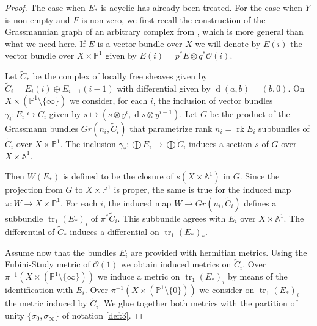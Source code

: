 \documentclass[10pt,twoside]{article}
\numberwithin{equation}{section}
\theoremstyle{plain}
\theoremstyle{definition}
\DeclareMathOperator{\tr}{tr}
\DeclareMathOperator{\dd}{d}
\DeclareMathOperator{\rk}{rk}
\begin{document}
\begin{proof}
  The case when $E_{\ast}$ is acyclic has already been treated. For
  the case when $Y$ is non-empty and $F$ is non zero, 
  we first recall the construction  of the
  Grassmannian graph of an arbitrary complex from
  \cite{GilletSoule:aRRt}, which 
  is more general than what we need here. If
  $E$ is a vector bundle over $X$ we will denote by $E(i)$ the vector
  bundle over $X\times \mathbb{P}^{1}$ given by $E(i)=p^{\ast}E\otimes
  q^{\ast} \mathcal{O}(i)$.

  Let
  $\widetilde C_{\ast}$ be the complex of locally free sheaves given
  by $\widetilde C_{i}=E_{i}(i)\oplus E_{i-1}(i-1)$ with differential
  given by $\dd(a,b)=(b,0)$. On $X\times (\mathbb{P}^{1}\setminus
  \{\infty\})$ we consider, for each $i$, the inclusion of vector
  bundles $\gamma _{i}\colon E_{i}\hookrightarrow \widetilde C_{i}$ given by
  $s\longmapsto (s\otimes y^{i},\dd s\otimes y^{i-1})$. Let $G$ be the
  product of the Grassmann bundles $Gr(n_{i},\widetilde C_{i})$
  that parametrize rank $n_{i}=\rk E_{i}$ subbundles of $\widetilde
  C_{i}$ over $X\times \mathbb{P}^{1}$. The inclusion $\gamma_{\ast }
  \colon \bigoplus E_{i}\longrightarrow \bigoplus \widetilde C_{i}$ induces
  a section $s$ of $G$ over $X\times \mathbb{A}^{1}$.

  Then $W(E_{\ast})$ is defined to be the closure of $s(X\times
  \mathbb{A}^{1})$ in $G$. Since the projection from $G$ to $X\times
  \mathbb{P}^{1}$ is proper, the same is true for the induced map
  $\pi\colon W\longrightarrow X\times 
  \mathbb{P}^{1}$.  For each $i$,
  the induced map $W\longrightarrow
  Gr(n_{i},\widetilde C_{i})$ defines a subbundle
  $\tr_{1}(E_{\ast})_{i}$ of $\pi ^{\ast} \widetilde C_{i}$. This subbundle
  agrees with $E_{i}$ over $X\times \mathbb{A}^{1}$. The differential
  of $\widetilde C_{\ast}$ induces a differential on
  $\tr_{1}(E_{\ast})_{\ast}$.  

  Assume now that the bundles $E_{i}$ are provided with hermitian
  metrics. Using the Fubini-Study metric of $\mathcal{O}(1)$ we obtain
  induced metrics on $\widetilde C_{i}$. Over $\pi ^{-1}(X\times
  (\mathbb{P}^{1}\setminus \{\infty\}))$ we induce a metric on
  $\tr_{1}(E_{\ast})_{i}$ by means of the identification with
  $E_{i}$. Over $\pi ^{-1}(X\times
  (\mathbb{P}^{1}\setminus \{0\}))$ we consider on
  $\tr_{1}(E_{\ast})_{i}$ the metric induced by $\widetilde C_{i}$. We glue
  together 
  both metrics with the partition of unity $\{\sigma _{0},\sigma
  _{\infty}\}$ of notation \ref{def:3}. 


\end{proof}
\end{document}
